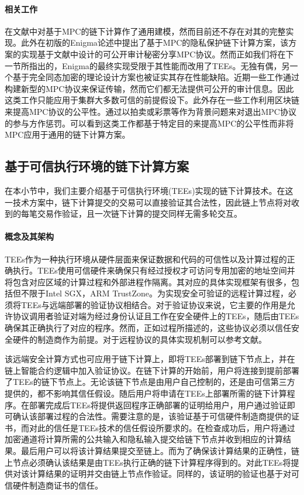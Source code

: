 \paragraph{相关工作} 
在文献\cite{8726574}中对基于MPC的链下计算作了通用建模，然而目前还不存在对其的完整实现。此外在初版的Enigma\cite{2015arXiv150603471Z}论述中提出了基于MPC的隐私保护链下计算方案，该方案的实现基于文献\cite{cryptoeprint:2014/075}中设计的可公开审计秘密分享MPC协议。然而正如我们将在下一节所指出的，Enigma\cite{enigma2019}的最终实现受限于其性能而改用了TEEs。无独有偶，另一个基于完全同态加密的理论设计方案\cite{10.5555/1834954}也被证实其存在性能缺陷\cite{10.1145/2046660.2046682}。近期一些工作\cite{cryptoeprint:2019/883, 10.1145/3372297.3417261}通过构建新型的MPC协议来保证传输，然而它们都无法提供可公开的审计信息。因此这类工作只能应用于集群大多数可信的前提假设下。此外存在一些工作利用区块链来提高MPC协议的公平性。通过以拍卖或彩票\cite{6956580, 2017arXiv170106726B}等作为背景问题来对退出MPC协议的参与方作惩罚。可以看到这类工作都基于特定目的来提高MPC的公平性而非将MPC应用于通用的链下计算方案。

\subsection{基于可信执行环境的链下计算方案}
在本小节中，我们主要介绍基于可信执行环境(TEEs)实现的链下计算技术。在这一技术方案中，链下计算提交的交易可以直接验证其合法性，因此链上节点将对收到的每笔交易作验证，且一次链下计算的提交同样无需多轮交互。

\paragraph{概念及其架构} 
TEEs作为一种执行环境从硬件层面来保证数据和代码的可信性以及计算过程的正确执行\cite{10.1007/978-3-662-53887-6_7}。TEEs使用可信硬件来确保只有经过授权才可访问专用加密的地址空间并将包含对应区域的计算过程和外部进程作隔离。其对应的具体实现框架有很多，包括但不限于Intel SGX\cite{90}，ARM TrustZone\cite{Trustzone}。为实现安全可验证的远程计算过程，必须将TEEs与远端部署的验证协议相结合。对于验证协议来说，它主要的作用是允许协议调用者验证对端为经过身份认证且工作在安全硬件上的TEEs，随后由TEEs确保其正确执行了对应的程序。然而，正如过程所描述的，这些协议必须以信任安全硬件的制造商作为前提。对于远程协议的具体实现机制可以参考文献\cite{90}。

该远端安全计算方式也可应用于链下计算上，即将TEEs部署到链下节点上，并在链上智能合约逻辑中加入验证协议。在链下计算的开始前，用户将连接到提前部署了TEEs的链下节点上。无论该链下节点是由用户自己控制的，还是由可信第三方提供的，都不影响其信任假设。随后用户将申请在TEEs上部署所需的链下计算程序。在部署完成后TEEs将提供返回程序正确部署的证明给用户，用户通过验证即可确认该部署过程的合法性。需要注意的是，该验证基于可信硬件制造商提供的证书，而对此的信任是TEEs技术的信任假设所要求的。在检查成功后，用户将通过加密通道将计算所需的公共输入和隐私输入提交给链下节点并收到相应的计算结果。最后用户可以将该计算结果提交至链上。而为了确保该计算结果的正确性，链上节点必须确认该结果是由TEEs执行正确的链下计算程序得到的。对此TEEs将提供对该计算结果的证明并交由链上节点作验证。同样的，该证明的验证也基于对可信硬件制造商证书的信任。

